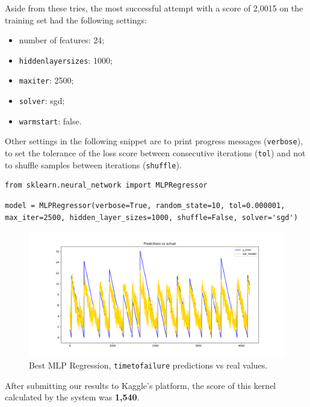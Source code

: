 \bigbreak

Aside from these tries, the most successful attempt with a score of 2,0015 on the training set had the following settings:
\begin{itemize}
	\item number of features: 24;
	\item \texttt{hidden\textunderscore layer\textunderscore sizes}: 1000;
	\item \texttt{max\textunderscore iter}: 2500;
	\item \texttt{solver}: sgd;
	\item \texttt{warm\textunderscore start}: false.
\end{itemize}
Other settings in the following snippet are to print progress messages (\texttt{verbose}), to set the tolerance of the loss score between consecutive iterations (\texttt{tol}) and not to shuffle samples between iterations (\texttt{shuffle}).

\begin{lstlisting}[firstnumber=14]
from sklearn.neural_network import MLPRegressor
\end{lstlisting}

\begin{lstlisting}[firstnumber=109]
model = MLPRegressor(verbose=True, random_state=10, tol=0.000001, max_iter=2500, hidden_layer_sizes=1000, shuffle=False, solver='sgd')
\end{lstlisting}

\begin{figure} [h]
	\centering
	\includegraphics[width=1\linewidth]{pictures/bestnn.png}
	\caption{Best MLP Regression, \texttt{time\textunderscore to\textunderscore failure} predictions vs real values.}
	\label{fig:MLP}
\end{figure}

After submitting our results to Kaggle's platform, the score of this kernel calculated by the system was \textbf{1,540}.

